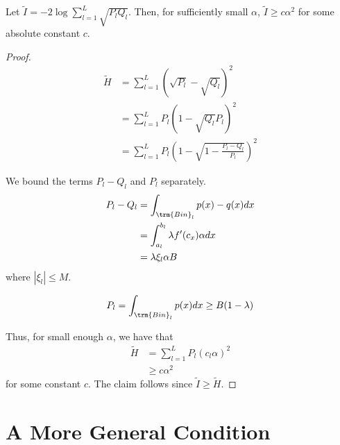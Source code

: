 \documentclass{article}
\begin{document}
\begin{proposition}
Let $\tilde{I} = -2 \log \sum_{l=1}^L \sqrt{P_l Q_l}$. Then, for sufficiently small $\alpha$, $\tilde{I} \geq c \alpha^2$ for some absolute constant $c$. 
\end{proposition}

\begin{proof}

\begin{align*}
\tilde{H} &= \sum_{l=1}^L (\sqrt{P_l} - \sqrt{Q_l})^2 \\
   &= \sum_{l=1}^L P_l \left( 1 - \sqrt{Q_l}{P_l} \right)^2 \\
 &= \sum_{l=1}^L P_l \left( 1 - \sqrt{1 - \frac{P_l - Q_l}{P_l}} \right)^2 
\end{align*}

We bound the terms $P_l - Q_l$ and $P_l$ separately. 
\begin{align*}
P_l - Q_l &= \int_{\trm{Bin}_l} p(x) - q(x) dx \\
  &= \int_{a_l}^{b_l} \lambda f'(c_x) \alpha dx \\
  &= \lambda \xi_l \alpha B
\end{align*}
where $|\xi_l| \leq M$.

\[
P_l = \int_{\trm{Bin}_l} p(x) dx \geq B(1-\lambda)
\]

Thus, for small enough $\alpha$, we have that
\begin{align*}
\tilde{H} &= \sum_{l=1}^L P_l \left( c_l \alpha \right)^2 \\
 &\geq c \alpha^2
\end{align*}
for some constant $c$. The claim follows since $\tilde{I} \geq \tilde{H}$. 

\end{proof}

\section{A More General Condition}





\end{document}
